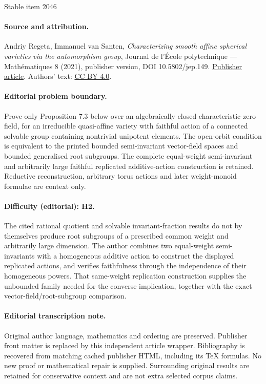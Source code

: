 \documentclass[11pt]{article}
\numberwithin{equation}{section}
\theoremstyle{plain}
\theoremstyle{definition}
\begin{document}
\begin{center}{\Large Stable item 2046}\end{center}
\paragraph{Source and attribution.}
Andriy Regeta, Immanuel van Santen, \emph{Characterizing smooth affine spherical varieties via the automorphism group}, Journal de l’École polytechnique — Mathématiques 8 (2021), publisher version, DOI 10.5802/jep.149. \href{https://jep.centre-mersenne.org/articles/10.5802/jep.149/}{Publisher article}. Authors' text: \href{https://creativecommons.org/licenses/by/4.0/}{CC BY 4.0}.
\paragraph{Editorial problem boundary.}
Prove only Proposition 7.3 below over an algebraically closed characteristic-zero field, for an irreducible quasi-affine variety with faithful action of a connected solvable group containing nontrivial unipotent elements. The open-orbit condition is equivalent to the printed bounded semi-invariant vector-field spaces and bounded generalised root subgroups. The complete equal-weight semi-invariant and arbitrarily large faithful replicated additive-action construction is retained. Reductive reconstruction, arbitrary torus actions and later weight-monoid formulae are context only.
\paragraph{Difficulty (editorial): H2.}
The cited rational quotient and solvable invariant-fraction results do not by themselves produce root subgroups of a prescribed common weight and arbitrarily large dimension. The author combines two equal-weight semi-invariants with a homogeneous additive action to construct the displayed replicated actions, and verifies faithfulness through the independence of their homogeneous powers. That same-weight replication construction supplies the unbounded family needed for the converse implication, together with the exact vector-field/root-subgroup comparison.
\paragraph{Editorial transcription note.}
Original author language, mathematics and ordering are preserved. Publisher front matter is replaced by this independent article wrapper. Bibliography is recovered from matching cached publisher HTML, including its TeX formulas. No new proof or mathematical repair is supplied. Surrounding original results are retained for conservative context and are not extra selected corpus claims.
\clearpage
\end{document}
